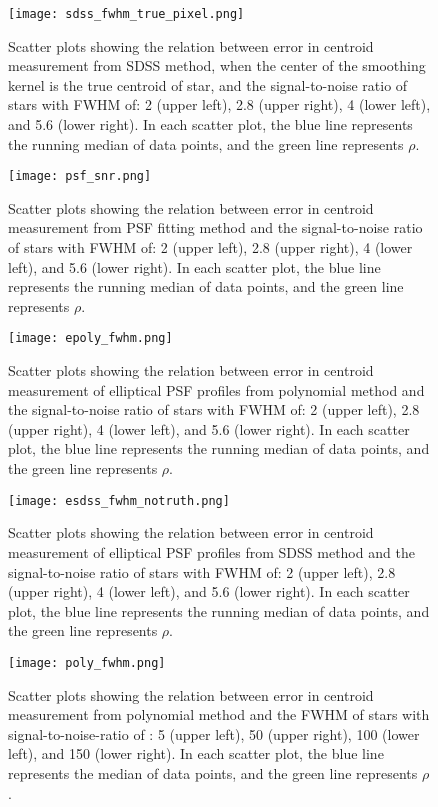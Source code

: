 \documentclass[12pt, preprint]{aastex}
\begin{document}
\begin{figure}[!htb]
  \texttt{[image: sdss\_fwhm\_true\_pixel.png]}
\endminipage
\caption{Scatter plots showing the relation between error in centroid measurement from SDSS method, when the center of the smoothing kernel is the true centroid of star, and the signal-to-noise ratio of stars with FWHM of: 2 (upper left), 2.8 (upper right), 4 (lower left), and 5.6 (lower right). In each scatter plot, the blue line represents the running median of data points, and the green line represents $\rho$.}\label{22}
\end{figure}

\begin{figure}[!htb]
  \texttt{[image: psf\_snr.png]}
\endminipage
\caption{Scatter plots showing the relation between error in centroid measurement from PSF fitting method and the signal-to-noise ratio of stars with FWHM of: 2 (upper left), 2.8 (upper right), 4 (lower left), and 5.6 (lower right). In each scatter plot, the blue line represents the running median of data points, and the green line represents $\rho$.}\label{3}
\end{figure}

\begin{figure}[!htb]
  \texttt{[image: epoly\_fwhm.png]}
\endminipage
\caption{Scatter plots showing the relation between error in centroid measurement of elliptical PSF profiles from polynomial method and the signal-to-noise ratio of stars with FWHM of: 2 (upper left), 2.8 (upper right), 4 (lower left), and 5.6 (lower right). In each scatter plot, the blue line represents the running median of data points, and the green line represents $\rho$.}\label{111}
\end{figure}

\begin{figure}[!htb]
  \texttt{[image: esdss\_fwhm\_notruth.png]}
\endminipage
\caption{Scatter plots showing the relation between error in centroid measurement of elliptical PSF profiles from SDSS method and the signal-to-noise ratio of stars with FWHM of: 2 (upper left), 2.8 (upper right), 4 (lower left), and 5.6 (lower right). In each scatter plot, the blue line represents the running median of data points, and the green line represents $\rho$.}\label{222}
\end{figure}


\begin{figure}[!htb]
  \texttt{[image: poly\_fwhm.png]}
\endminipage
\caption{Scatter plots showing the relation between error in centroid measurement from polynomial method and the FWHM of stars with signal-to-noise-ratio of : 5 (upper left), 50 (upper right), 100 (lower left), and 150 (lower right). In each scatter plot, the blue line represents the median of data points, and the green line represents $\rho$.}\label{4}
\end{figure}
\end{document}
